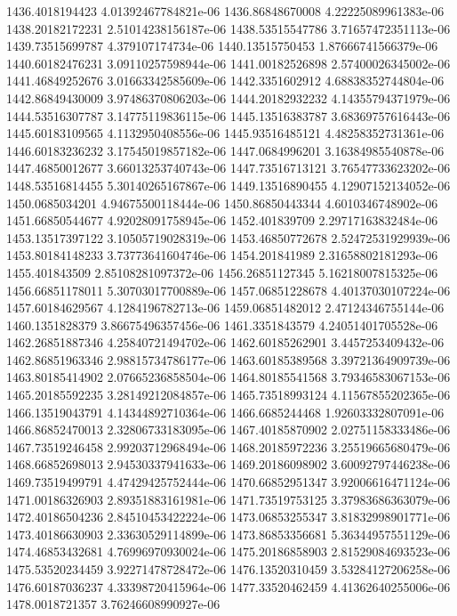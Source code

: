{1436.4018194423 4.01392467784821e-06
1436.86848670008 4.22225089961383e-06
1438.20182172231 2.51014238156187e-06
1438.53515547786 3.71657472351113e-06
1439.73515699787 4.379107174734e-06
1440.13515750453 1.87666741566379e-06
1440.60182476231 3.09110257598944e-06
1441.00182526898 2.57400026345002e-06
1441.46849252676 3.01663342585609e-06
1442.3351602912 4.68838352744804e-06
1442.86849430009 3.97486370806203e-06
1444.20182932232 4.14355794371979e-06
1444.53516307787 3.14775119836115e-06
1445.13516383787 3.68369757616443e-06
1445.60183109565 4.1132950408556e-06
1445.93516485121 4.48258352731361e-06
1446.60183236232 3.17545019857182e-06
1447.0684996201 3.16384985540878e-06
1447.46850012677 3.66013253740743e-06
1447.73516713121 3.76547733623202e-06
1448.53516814455 5.30140265167867e-06
1449.13516890455 4.12907152134052e-06
1450.0685034201 4.94675500118444e-06
1450.86850443344 4.6010346748902e-06
1451.66850544677 4.92028091758945e-06
1452.401839709 2.29717163832484e-06
1453.13517397122 3.10505719028319e-06
1453.46850772678 2.52472531929939e-06
1453.80184148233 3.73773641604746e-06
1454.201841989 2.31658802181293e-06
1455.401843509 2.85108281097372e-06
1456.26851127345 5.16218007815325e-06
1456.66851178011 5.30703017700889e-06
1457.06851228678 4.40137030107224e-06
1457.60184629567 4.1284196782713e-06
1459.06851482012 2.47124346755144e-06
1460.1351828379 3.86675496357456e-06
1461.3351843579 4.24051401705528e-06
1462.26851887346 4.25840721494702e-06
1462.60185262901 3.4457253409432e-06
1462.86851963346 2.98815734786177e-06
1463.60185389568 3.39721364909739e-06
1463.80185414902 2.07665236858504e-06
1464.80185541568 3.79346583067153e-06
1465.20185592235 3.28149212084857e-06
1465.73518993124 4.11567855202365e-06
1466.13519043791 4.14344892710364e-06
1466.6685244468 1.92603332807091e-06
1466.86852470013 2.32806733183095e-06
1467.40185870902 2.02751158333486e-06
1467.73519246458 2.99203712968494e-06
1468.20185972236 3.25519665680479e-06
1468.66852698013 2.94530337941633e-06
1469.20186098902 3.60092797446238e-06
1469.73519499791 4.47429425752444e-06
1470.66852951347 3.92006616471124e-06
1471.00186326903 2.89351883161981e-06
1471.73519753125 3.37983686363079e-06
1472.40186504236 2.84510453422224e-06
1473.06853255347 3.81832998901771e-06
1473.40186630903 2.33630529114899e-06
1473.86853356681 5.36344957551129e-06
1474.46853432681 4.76996970930024e-06
1475.20186858903 2.81529084693523e-06
1475.53520234459 3.92271478728472e-06
1476.13520310459 3.53284127206258e-06
1476.60187036237 4.33398720415964e-06
1477.33520462459 4.41362640255006e-06
1478.0018721357 3.76246608990927e-06
}
